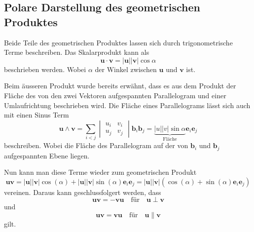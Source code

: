 \subsection{Polare Darstellung des geometrischen Produktes}
Beide Teile des geometrischen Produktes lassen sich durch trigonometrische Terme beschreiben. Das Skalarprodukt kann als 
\begin{equation}
    \textbf{u}\cdot \textbf{v} = |\textbf{u}||\textbf{v}|\cos{\alpha}
\end{equation}
beschrieben werden. Wobei $\alpha$ der Winkel zwischen $\textbf{u}$ und $\textbf{v}$ ist.

Beim äusseren Produkt wurde bereits erwähnt, dass es aus dem Produkt der Fläche des von den zwei Vektoren aufgespannten Parallelogram und einer Umlaufrichtung beschrieben wird. Die Fläche eines Parallelograms lässt sich auch mit einen Sinus Term
\begin{equation}
    \textbf{u} \wedge \textbf{v}
    = 
    \sum_{i<j}
    \begin{vmatrix} 
        u_i & v_i \\
        u_j & v_j
    \end{vmatrix}\textbf{b}_i\textbf{b}_j  
    = 
    \underbrace{|u||v|\sin{\alpha}}_{\text{Fläche}}\textbf{e}_i\textbf{e}_j
\end{equation}
beschreiben.
Wobei die Fläche des Parallelogram auf der von $\textbf{b}_i$ und $\textbf{b}_j$ aufgespannten Ebene liegen.

Nun kann man diese Terme wieder zum geometrischen Produkt
\begin{equation}
    \textbf{u}\textbf{v}
    = 
    |\textbf{u}||\textbf{v}|\cos{(\alpha)} 
    + 
    |\textbf{u}||\textbf{v}|\sin{(\alpha)} \textbf{e}_i\textbf{e}_j
    = 
    |\textbf{u}||\textbf{v}|(\cos{(\alpha)} + \sin{(\alpha)}\textbf{e}_i\textbf{e}_j)
\end{equation}
vereinen.
Daraus kann geschlussfolgert werden, dass
\begin{equation}
	\textbf{u} \textbf{v}=-\textbf{v}\textbf{u} \quad \textrm{für} \quad \textbf{u}\perp \textbf{v} 
	\label{uperpv}
\end{equation}
und
\begin{equation}
	\textbf{u} \textbf{v}=\textbf{v}\textbf{u} \quad \textrm{für} \quad \textbf{u} \parallel \textbf{v} 
	\label{uparallelv}
\end{equation}
gilt.